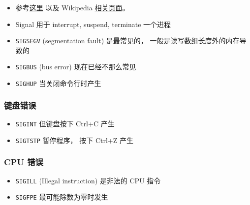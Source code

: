 
\begin{issues}
\issueDraft
\end{issues}

\begin{itemize}
\item 参考\href{https://unix.stackexchange.com/questions/6332/what-causes-various-signals-to-be-sent}{这里} 以及 Wikipedia \href{https://en.wikipedia.org/wiki/Signal_(IPC)}{相关页面}。
\item Signal 用于 interrupt, suspend, terminate 一个进程
\item \verb|SIGSEGV| (segmentation fault) 是最常见的， 一般是读写数组长度外的内存导致的
\item \verb|SIGBUS| (bus error) 现在已经不那么常见
\item \verb|SIGHUP| 当关闭命令行时产生
\end{itemize}

\subsubsection{键盘错误}
\begin{itemize}
\item \verb|SIGINT| 但键盘按下 Ctrl+C 产生
\item \verb|SIGTSTP| 暂停程序， 按下 Ctrl+Z 产生
\end{itemize}

\subsubsection{CPU 错误}
\begin{itemize}
\item \verb|SIGILL| (Illegal instruction) 是非法的 CPU 指令
\item \verb|SIGFPE| 最可能除数为零时发生
\end{itemize}
